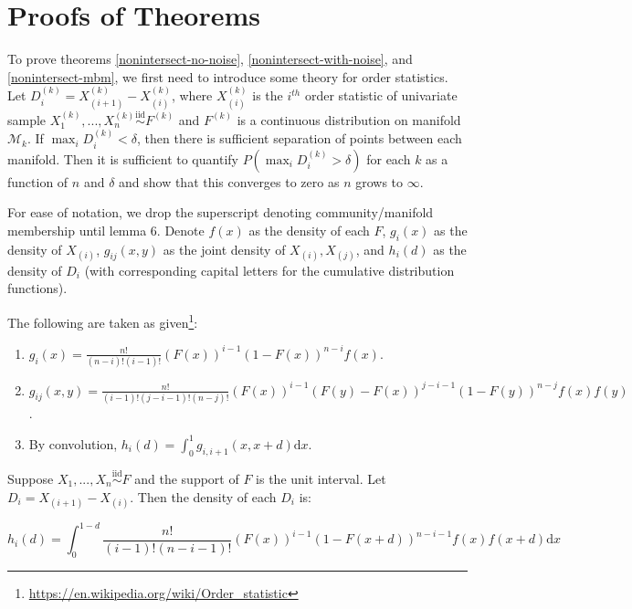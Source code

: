 \documentclass[12pt]{article}
\providecommand{\tightlist}{%
  \setlength{\itemsep}{0pt}\setlength{\parskip}{0pt}}
\begin{document}
\appendix

\section{Proofs of Theorems}

To prove theorems \ref{nonintersect-no-noise},
\ref{nonintersect-with-noise}, and \ref{nonintersect-mbm}, we first need
to introduce some theory for order statistics. Let
\(D_i^{(k)} = X_{(i+1)}^{(k)} - X_{(i)}^{(k)}\), where \(X_{(i)}^{(k)}\)
is the \(i^{th}\) order statistic of univariate sample
\(X_1^{(k)}, ..., X_n^{(k)} \stackrel{\mathrm{iid}}{\sim}F^{(k)}\) and
\(F^{(k)}\) is a continuous distribution on manifold \(\mathcal{M}_k\).
If \(\max_i D_i^{(k)} < \delta\), then there is sufficient separation of
points between each manifold. Then it is sufficient to quantify
\(P(\max_i D_i^{(k)} > \delta)\) for each \(k\) as a function of \(n\)
and \(\delta\) and show that this converges to zero as \(n\) grows to
\(\infty\).

For ease of notation, we drop the superscript denoting
community/manifold membership until lemma 6. Denote \(f(x)\) as the
density of each \(F\), \(g_i(x)\) as the density of \(X_{(i)}\),
\(g_{ij}(x, y)\) as the joint density of \(X_{(i)}, X_{(j)}\), and
\(h_i(d)\) as the density of \(D_i\) (with corresponding capital letters
for the cumulative distribution functions).

The following are taken as given\footnote{\url{https://en.wikipedia.org/wiki/Order_statistic}}:

\begin{enumerate}
\def\labelenumi{\arabic{enumi}.}
\tightlist
\item
  \(g_i(x) = \frac{n!}{(n-i)! (i-1)!} (F(x))^{i-1} (1 - F(x))^{n-i} f(x)\).
\item
  \(g_{ij}(x, y) = \frac{n!}{(i-1)! (j-i-1)! (n-j)!} (F(x))^{i-1} (F(y) - F(x))^{j-i-1} (1 - F(y))^{n-j} f(x) f(y)\).
\item
  By convolution,
  \(h_i(d) = \int_0^{1} g_{i, i+1} (x, x + d) \mathrm{d}x\).
\end{enumerate}

\begin{lemma}
Suppose $X_1, ..., X_n \stackrel{\mathrm{iid}}{\sim}F$ and the support of $F$ is the unit interval. 
Let $D_i = X_{(i+1)} - X_{(i)}$. 
Then the density of each $D_i$ is: 

\begin{equation}
\label{eq:pdf}
h_i(d) = \int_0^{1-d} \frac{n!}{(i-1)! (n-i-1)!} (F(x))^{i-1} (1 - F(x+d))^{n-i-1} f(x) f(x+d) \mathrm{d}x 
\end{equation}
\end{lemma}
\end{document}
